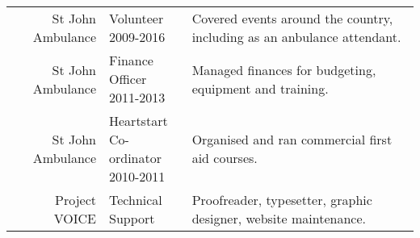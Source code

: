 \documentclass[letterpaper]{deedy-resume} %
\begin{document}
\begin{minipage}[t]{0.66\textwidth}
\begin{tabular}{rlm{6cm}}
St John Ambulance & \makecell[l]{Volunteer \\ 2009-2016} & Covered events around the country, including as an anbulance attendant. \\
St John Ambulance & \makecell[l]{Finance Officer \\ 2011-2013} &
Managed finances for budgeting, equipment and training. \\
St John Ambulance & \makecell[l]{Heartstart \\ Co-ordinator \\ 2010-2011} &
Organised and ran commercial first aid courses. \\
Project VOICE & \makecell[l]{Technical \\ Support} & Proofreader, typesetter, graphic designer, website maintenance. \\
\end{tabular}

\sectionspace %


\end{minipage} %








\end{document}
